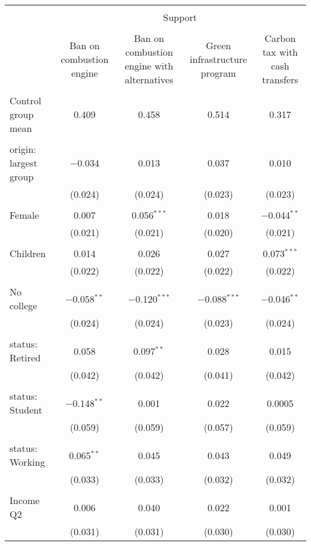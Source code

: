 
\begin{tabular}{@{\extracolsep{5pt}}lcccc} 
\\[-1.8ex]\hline 
\hline \\[-1.8ex] 
 & \multicolumn{4}{c}{Support} \\ 
\cline{2-5} 
\\[-1.8ex] & Ban on combustion engine & Ban on combustion engine with alternatives & Green infrastructure program & Carbon tax with cash transfers \\ 
\hline \\[-1.8ex] 
 Control group mean & 0.409 & 0.458 & 0.514 & 0.317  \\ \hline \\[-1.8ex] origin: largest group & $-$0.034 & 0.013 & 0.037 & 0.010 \\ 
  & (0.024) & (0.024) & (0.023) & (0.023) \\ 
  & & & & \\ 
 Female & 0.007 & 0.056$^{***}$ & 0.018 & $-$0.044$^{**}$ \\ 
  & (0.021) & (0.021) & (0.020) & (0.021) \\ 
  & & & & \\ 
 Children & 0.014 & 0.026 & 0.027 & 0.073$^{***}$ \\ 
  & (0.022) & (0.022) & (0.022) & (0.022) \\ 
  & & & & \\ 
 No college & $-$0.058$^{**}$ & $-$0.120$^{***}$ & $-$0.088$^{***}$ & $-$0.046$^{**}$ \\ 
  & (0.024) & (0.024) & (0.023) & (0.024) \\ 
  & & & & \\ 
 status: Retired & 0.058 & 0.097$^{**}$ & 0.028 & 0.015 \\ 
  & (0.042) & (0.042) & (0.041) & (0.042) \\ 
  & & & & \\ 
 status: Student & $-$0.148$^{**}$ & 0.001 & 0.022 & 0.0005 \\ 
  & (0.059) & (0.059) & (0.057) & (0.059) \\ 
  & & & & \\ 
 status: Working & 0.065$^{**}$ & 0.045 & 0.043 & 0.049 \\ 
  & (0.033) & (0.033) & (0.032) & (0.032) \\ 
  & & & & \\ 
 Income Q2 & 0.006 & 0.040 & 0.022 & 0.001 \\ 
  & (0.031) & (0.031) & (0.030) & (0.030) \\ 

\end{tabular}
